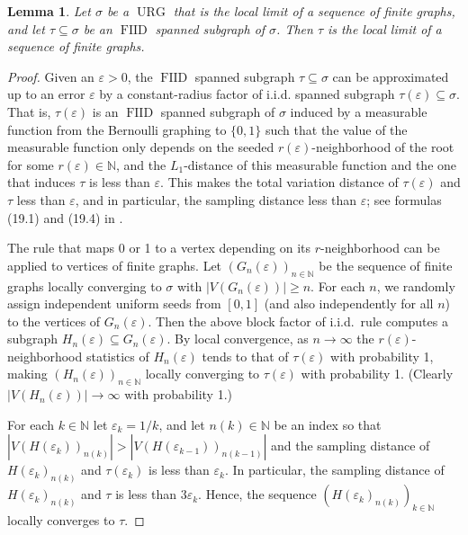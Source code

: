 \documentclass[12pt,a4paper]{article}
\newtheorem{Lemma}[Theorem]{Lemma}
\newcommand{\eps}{\varepsilon}
\newcommand{\N}{\mathbb{N}}
\renewcommand{\:}{\colon}
\DeclareMathOperator{\URG}{URG}
\DeclareMathOperator{\FIID}{FIID}
\begin{document}
\begin{Lemma}
Let $\sigma$ be a $\URG$ that is the local limit of a sequence of finite graphs, and let $\tau\subseteq \sigma$ be an $\FIID$ spanned subgraph of $\sigma$. 
Then $\tau$ is the local limit of a sequence of finite graphs. 
\end{Lemma}
\begin{proof}
Given an $\eps>0$, the $\FIID$ spanned subgraph $\tau\subseteq \sigma$ can be approximated up to an error $\eps$ by a constant-radius factor of i.i.d. spanned subgraph $\tau(\eps)\subseteq \sigma$. 
That is, $\tau(\eps)$ is an $\FIID$ spanned subgraph of $\sigma$ induced by a measurable function from the Bernoulli graphing to $\{0,1\}$ such that the value of the measurable function only depends on the seeded $r(\eps)$-neighborhood of the root for some $r(\eps)\in \N$, and the $L_1$-distance of this measurable function and the one that induces $\tau$ is less than $\eps$. 
This makes the total variation distance of $\tau(\eps)$ and $\tau$ less than $\eps$, and in particular, the sampling distance less than $\eps$; see formulas (19.1) and (19.4) in \cite{Lovaszbook}. 

The rule that maps 0 or 1 to a vertex depending on its $r$-neighborhood can be applied to vertices of finite graphs. 
Let $(G_n(\eps))_{n\in \N}$ be the sequence of finite graphs locally converging to $\sigma$ with $|V(G_n(\eps))|\geq n$. 
For each $n$, we randomly assign independent uniform seeds from $[0,1]$ (and also independently for all $n$) to the vertices of $G_n(\eps)$. 
Then the above block factor of i.i.d.\ rule computes a subgraph $H_n(\eps)\subseteq G_n(\eps)$. 
By local convergence, as $n\rightarrow \infty$ the $r(\eps)$-neighborhood statistics of $H_n(\eps)$ tends to that of $\tau(\eps)$ with probability 1, making $(H_n(\eps))_{n\in \N}$ locally converging to $\tau(\eps)$ with probability 1. 
(Clearly $|V(H_n(\eps))|\rightarrow \infty$ with probability 1.)

For each $k\in\N$ let $\eps_k=1/k$, and let $n(k)\in \N$ be an index so that $|V(H(\eps_k))_{n(k)}|>|V(H(\eps_{k-1}))_{n(k-1)}|$ and the sampling distance of $H(\eps_k)_{n(k)}$ and $\tau(\eps_k)$ is less than $\eps_k$. 
In particular, the sampling distance of $H(\eps_k)_{n(k)}$ and $\tau$ is less than $3\eps_k$. 
Hence, the sequence $(H(\eps_k)_{n(k)})_{k\in \N}$ locally converges to $\tau$.  
\end{proof}
\end{document}
